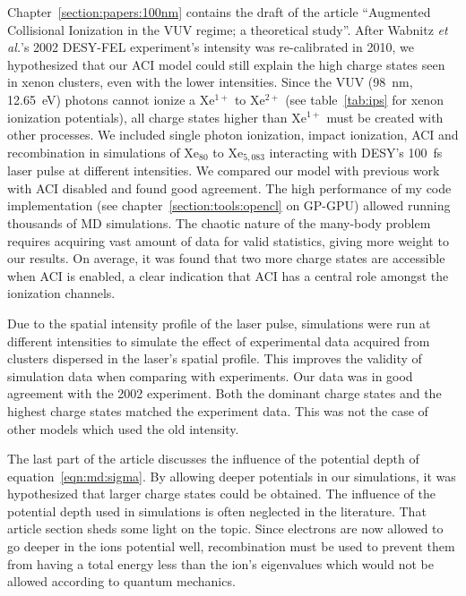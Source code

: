 Chapter~\ref{section:papers:100nm} contains the draft of the article
``Augmented Collisional Ionization in the VUV regime; a theoretical study''.
After Wabnitz \textit{et al.}'s
2002 DESY-FEL experiment's intensity was re-calibrated in 2010, we hypothesized
that our ACI model could still explain the high charge states seen in xenon
clusters, even with the lower intensities.
Since the VUV (98~nm, 12.65~eV)
photons cannot ionize a Xe$^{1+}$ to Xe$^{2+}$ (see table~\ref{tab:ips} for xenon
ionization potentials), all charge states higher than Xe$^{1+}$ must be created
with other processes.
We included single photon ionization,
impact ionization, ACI and recombination in simulations of Xe$_{80}$ to Xe$_{5,083}$
interacting with DESY's 100~fs laser pulse at different intensities.
We compared our model
with previous work with ACI disabled and found good agreement.
The high performance of my
code implementation (see chapter~\ref{section:tools:opencl} on GP-GPU) allowed
running thousands of MD simulations. The chaotic nature of the many-body
problem requires acquiring vast amount of data for valid statistics, giving more
weight to our results. On average, it was found that two more charge states are
accessible when ACI is enabled, a clear indication that ACI has a central role
amongst the ionization channels.

Due to the spatial intensity profile of the laser pulse, simulations were run
at different intensities to simulate the effect of experimental data acquired
from clusters dispersed in the laser's spatial profile. This improves the validity of
simulation data when comparing with experiments.
Our data was in good agreement with the 2002 experiment. Both the dominant
charge states and the highest charge states matched the experiment data. This
was not the case of other models which used the old intensity.

The last part of the article discusses the influence of the potential depth
of equation~\eqref{eqn:md:sigma}.
By allowing deeper potentials in our
simulations, it was hypothesized that larger charge states could be obtained.
The influence of the potential depth used in simulations is often neglected in
the literature. That article section sheds some light on the topic.
Since electrons are now allowed to go deeper in the ions potential well,
recombination must be used to prevent them from having a total energy less than
the ion's eigenvalues which would not be allowed according to quantum mechanics.



